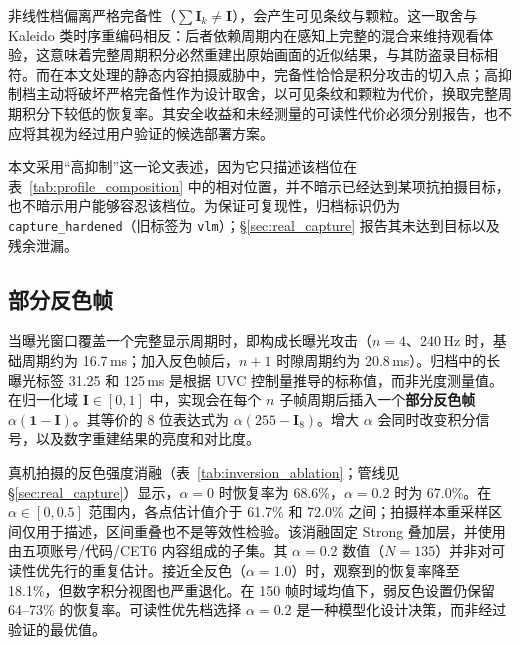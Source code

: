 \documentclass{ieeeaccess}
\begin{document}
非线性档偏离严格完备性（$\sum\mathbf{I}_k \neq \mathbf{I}$），会产生可见条纹与颗粒。这一取舍与 Kaleido 类时序重编码相反：后者依赖周期内在感知上完整的混合来维持观看体验，这意味着完整周期积分必然重建出原始画面的近似结果，与其防盗录目标相符。而在本文处理的静态内容拍摄威胁中，完备性恰恰是积分攻击的切入点；高抑制档主动将破坏严格完备性作为设计取舍，以可见条纹和颗粒为代价，换取完整周期积分下较低的恢复率。其安全收益和未经测量的可读性代价必须分别报告，也不应将其视为经过用户验证的候选部署方案。

本文采用“高抑制”这一论文表述，因为它只描述该档位在表~\ref{tab:profile_composition} 中的相对位置，并不暗示已经达到某项抗拍摄目标，也不暗示用户能够容忍该档位。为保证可复现性，归档标识仍为 \texttt{capture\_hardened}（旧标签为 \texttt{vlm}）；\S\ref{sec:real_capture} 报告其未达到目标以及残余泄漏。

\subsection{部分反色帧}

当曝光窗口覆盖一个完整显示周期时，即构成长曝光攻击（$n=4$、240\,Hz 时，基础周期约为 16.7\,ms；加入反色帧后，$n+1$ 时隙周期约为 20.8\,ms）。归档中的长曝光标签 31.25 和 125\,ms 是根据 UVC 控制量推导的标称值，而非光度测量值。在归一化域 $\mathbf{I}\in[0,1]$ 中，实现会在每个 $n$ 子帧周期后插入一个\textbf{部分反色帧} $\alpha(\mathbf{1}-\mathbf{I})$。其等价的 8 位表达式为 $\alpha(255-\mathbf{I}_{8})$。增大 $\alpha$ 会同时改变积分信号，以及数字重建结果的亮度和对比度。

真机拍摄的反色强度消融（表~\ref{tab:inversion_ablation}；管线见 \S\ref{sec:real_capture}）显示，$\alpha=0$ 时恢复率为 68.6\%，$\alpha=0.2$ 时为 67.0\%。在 $\alpha\in[0,0.5]$ 范围内，各点估计值介于 61.7\% 和 72.0\% 之间；拍摄样本重采样区间仅用于描述，区间重叠也不是等效性检验。该消融固定 Strong 叠加层，并使用由五项账号/代码/CET6 内容组成的子集。其 $\alpha=0.2$ 数值（$N=135$）并非对可读性优先行的重复估计。接近全反色（$\alpha=1.0$）时，观察到的恢复率降至 18.1\%，但数字积分视图也严重退化。在 150 帧时域均值下，弱反色设置仍保留 64--73\% 的恢复率。可读性优先档选择 $\alpha=0.2$ 是一种模型化设计决策，而非经过验证的最优值。
\end{document}
